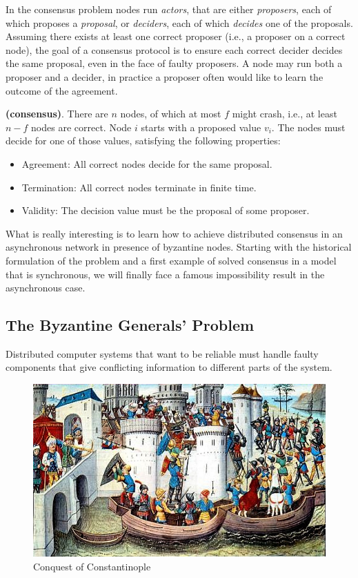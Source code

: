 \bigskip
\noindent
In the consensus problem nodes run \textit{actors}, that are either \textit{proposers}, each of which proposes a \textit{proposal}, or \textit{deciders}, each of which \textit{decides} one of the proposals. Assuming there exists at least one correct proposer
(i.e., a proposer on a correct node), the goal of a consensus protocol is to ensure each correct decider decides
the same proposal, even in the face of faulty proposers. A node may run both a proposer and a decider, in
practice a proposer often would like to learn the outcome of the agreement.
\begin{mydef} {\bf (consensus)}.\label{def:consensus}
    There are $n$ nodes, of which at most $f$ might crash, i.e., at least $n-f$ nodes are correct. Node $i$ starts with a proposed value $v_{i}$. The nodes must decide for one of those values, satisfying the following properties:
    \begin{itemize}
        \item Agreement: All correct nodes decide for the same proposal.
        \item Termination: All correct nodes terminate in finite time.
        \item Validity: The decision value must be the proposal of some proposer.
    \end{itemize}
\end{mydef}

\bigskip
\noindent
What is really interesting is to learn how to achieve distributed consensus in an asynchronous network in presence of byzantine nodes. Starting with the historical formulation of the problem and a first example of solved consensus in a model that is synchronous, we will finally face a famous impossibility result in the asynchronous case.

\bigskip
\subsection{The Byzantine Generals' Problem}
\label{sec:byzantine-generals}
Distributed computer systems that want to be reliable must handle faulty components that give conflicting information to different parts of the system.

\bigskip
\begin{figure}[h]
    \centering
	\includegraphics[width=0.9\linewidth]{Images/byzantine.jpeg}
	\caption{Conquest of Constantinople}
	\label{fig:generals}
\end{figure}

